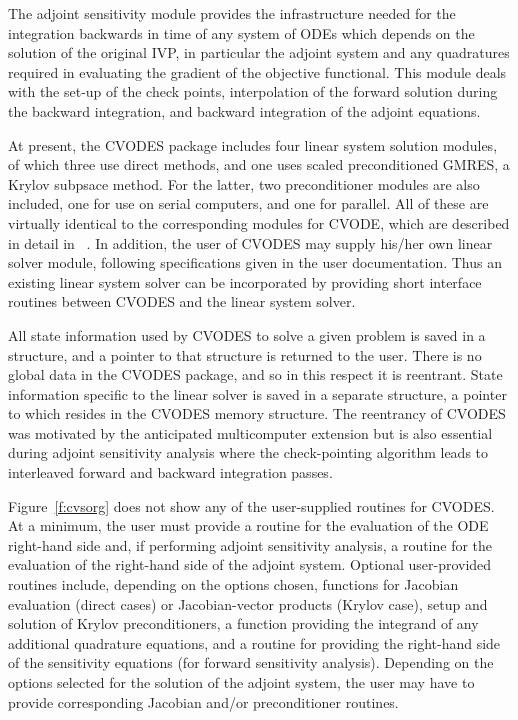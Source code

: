 The adjoint sensitivity module provides the infrastructure needed for
the integration backwards in time of any system of ODEs which depends
on the solution of the original IVP, in particular the adjoint system
and any quadratures required in evaluating the gradient of the
objective functional.  This module deals with the set-up of the check
points, interpolation of the forward solution during the backward
integration, and backward integration of the adjoint equations.

At present, the CVODES package includes four linear system solution
modules, of which three use direct methods, and one uses scaled
preconditioned GMRES, a Krylov subpsace method.  For the latter, two
preconditioner modules are also included, one for use on serial
computers, and one for parallel.  All of these are virtually identical
to the corresponding modules for CVODE, which are described in detail
in ~\cite{HBGLSSW:04}.  In addition, the user of CVODES may supply
his/her own linear solver module, following specifications given in
the user documentation.  Thus an existing linear system solver can be
incorporated by providing short interface routines between CVODES
and the linear system solver.

All state information used by CVODES to solve a given problem is saved
in a structure, and a pointer to that structure is returned to the
user.  There is no global data in the CVODES package, and so in this
respect it is reentrant. State information specific to the linear
solver is saved in a separate structure, a pointer to which resides in
the CVODES memory structure. The reentrancy of CVODES was motivated
by the anticipated multicomputer extension but is also essential
during adjoint sensitivity analysis where the check-pointing algorithm
leads to interleaved forward and backward integration passes. 

Figure~\ref{f:cvsorg} does not show any of the user-supplied routines
for CVODES. At a minimum, the user must provide a routine for the
evaluation of the ODE right-hand side and, if performing adjoint
sensitivity analysis, a routine for the evaluation of the right-hand
side of the adjoint system.  Optional user-provided routines include,
depending on the options chosen, functions for Jacobian evaluation
(direct cases) or Jacobian-vector products (Krylov case), setup and
solution of Krylov preconditioners, a function providing the integrand
of any additional quadrature equations, and a routine for providing
the right-hand side of the sensitivity equations (for forward
sensitivity analysis). Depending on the options selected for the
solution of the adjoint system, the user may have to provide
corresponding Jacobian and/or preconditioner routines.

